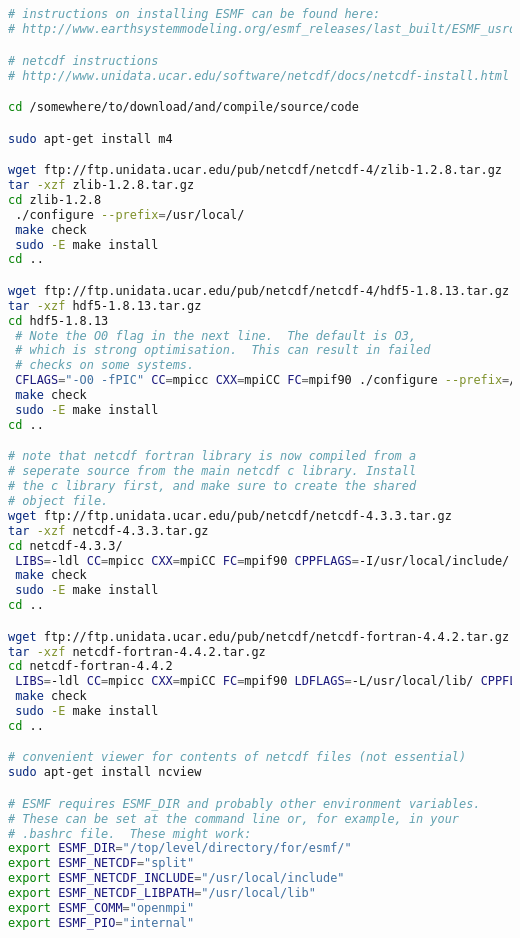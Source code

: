 \documentclass[12pt]{article}
\begin{document}
\begin{lstlisting}[language=bash]


# instructions on installing ESMF can be found here:
# http://www.earthsystemmodeling.org/esmf_releases/last_built/ESMF_usrdoc/node9.html

# netcdf instructions
# http://www.unidata.ucar.edu/software/netcdf/docs/netcdf-install.html

cd /somewhere/to/download/and/compile/source/code

sudo apt-get install m4

wget ftp://ftp.unidata.ucar.edu/pub/netcdf/netcdf-4/zlib-1.2.8.tar.gz
tar -xzf zlib-1.2.8.tar.gz 
cd zlib-1.2.8
 ./configure --prefix=/usr/local/
 make check
 sudo -E make install
cd ..

wget ftp://ftp.unidata.ucar.edu/pub/netcdf/netcdf-4/hdf5-1.8.13.tar.gz	
tar -xzf hdf5-1.8.13.tar.gz 
cd hdf5-1.8.13
 # Note the O0 flag in the next line.  The default is O3, 
 # which is strong optimisation.  This can result in failed 
 # checks on some systems.
 CFLAGS="-O0 -fPIC" CC=mpicc CXX=mpiCC FC=mpif90 ./configure --prefix=/usr/local/ --with-zlib=/usr/local  --enable-fortran --enable-parallel --enable-shared
 make check
 sudo -E make install
cd ..

# note that netcdf fortran library is now compiled from a 
# seperate source from the main netcdf c library. Install 
# the c library first, and make sure to create the shared
# object file. 
wget ftp://ftp.unidata.ucar.edu/pub/netcdf/netcdf-4.3.3.tar.gz
tar -xzf netcdf-4.3.3.tar.gz 
cd netcdf-4.3.3/
 LIBS=-ldl CC=mpicc CXX=mpiCC FC=mpif90 CPPFLAGS=-I/usr/local/include/ LDFLAGS=-L/usr/local/lib/  ./configure --prefix=/usr/local --enable-parallel 
 make check
 sudo -E make install
cd ..

wget ftp://ftp.unidata.ucar.edu/pub/netcdf/netcdf-fortran-4.4.2.tar.gz
tar -xzf netcdf-fortran-4.4.2.tar.gz 
cd netcdf-fortran-4.4.2
 LIBS=-ldl CC=mpicc CXX=mpiCC FC=mpif90 LDFLAGS=-L/usr/local/lib/ CPPFLAGS="-I/usr/local/include -DUSE_NETCDF4"  ./configure --prefix=/usr/local
 make check
 sudo -E make install
cd ..

# convenient viewer for contents of netcdf files (not essential)
sudo apt-get install ncview

# ESMF requires ESMF_DIR and probably other environment variables.  
# These can be set at the command line or, for example, in your 
# .bashrc file.  These might work:
export ESMF_DIR="/top/level/directory/for/esmf/"
export ESMF_NETCDF="split"
export ESMF_NETCDF_INCLUDE="/usr/local/include"
export ESMF_NETCDF_LIBPATH="/usr/local/lib"
export ESMF_COMM="openmpi"
export ESMF_PIO="internal"
                                                                                                              

\end{lstlisting}
\end{document}
